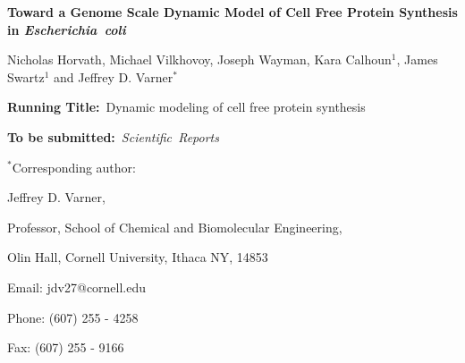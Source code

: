 \documentclass[12pt]{article}
\begin{document}
\begin{titlepage}
{\par\centering\textbf{\Large {Toward a Genome Scale Dynamic Model of Cell Free Protein Synthesis in \emph{Escherichia~coli}}}}
\vspace{0.05in}
{\par \centering \large{Nicholas Horvath, Michael Vilkhovoy, Joseph Wayman, Kara Calhoun$^{1}$, James Swartz$^{1}$ and Jeffrey D. Varner$^{*}$}}
\vspace{0.10in}
{\par {}}
{\par {}}
\vspace{0.1in}
{\par {}}
{\par {}}
{\par \centering \textbf{Running Title:}~Dynamic modeling of cell free protein synthesis}
\vspace{0.1in}
{\par \centering \textbf{To be submitted:}~\emph{Scientific~Reports}}
\vspace{0.5in}
{\par \centering $^{*}$Corresponding author:}
{\par \centering Jeffrey D. Varner,}
{\par \centering Professor, School of Chemical and Biomolecular Engineering,}
{\par {} Olin Hall, Cornell University, Ithaca NY, 14853}
{\par \centering Email: jdv27@cornell.edu}
{\par \centering Phone: (607) 255 - 4258}
{\par \centering Fax: (607) 255 - 9166}
\end{titlepage}
\date{}
\thispagestyle{empty}
\pagebreak
\end{document}
